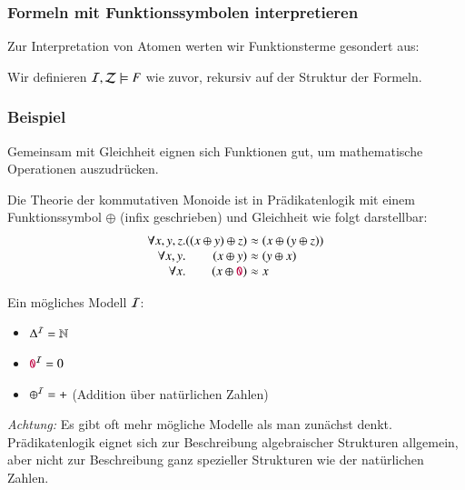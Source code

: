 \documentclass[aspectratio=1610,onlymath]{beamer}
\begin{document}
\begin{frame}\frametitle{Formeln mit Funktionssymbolen interpretieren}

Zur Interpretation von Atomen werten wir Funktionsterme gesondert aus:

\bigskip

Wir definieren $\mathcal{I},\mathcal{Z}\models F$ wie zuvor, rekursiv auf der Struktur
der Formeln.

\end{frame}

\begin{frame}\frametitle{Beispiel}

Gemeinsam mit Gleichheit eignen sich Funktionen gut, um mathematische Operationen auszudrücken.
\bigskip

Die Theorie der kommutativen Monoide ist in Prädikatenlogik mit einem Funktionssymbol $\oplus$ (infix geschrieben) und Gleichheit  wie folgt darstellbar:
\[\begin{array}{r@{}r@{}l}
\forall x,y,z.& ((x\oplus y)\oplus z) &{}\approx(x\oplus (y\oplus z))\\
\forall x,y.& (x\oplus y)& {}\approx(y\oplus x)\\
\forall x.& (x\oplus\Sterm{0})& {}\approx x
\end{array}\]

Ein mögliches Modell $\mathcal{I}$:
\begin{itemize}
\item $\Delta^{\mathcal{I}}=\mathbb{N}$
\item $\mathtt{\textcolor{purple}{0}}^{\mathcal{I}}=0$
\item ${\oplus^{\mathcal{I}}}={+}$ (Addition über natürlichen Zahlen)
\end{itemize}\bigskip

{\tiny
\emph{Achtung:} Es gibt oft mehr mögliche Modelle als man zunächst denkt. Prädikatenlogik eignet sich zur Beschreibung algebraischer Strukturen allgemein, aber nicht zur Beschreibung ganz
spezieller Strukturen wie der natürlichen Zahlen.

}

\end{frame}
\end{document}
